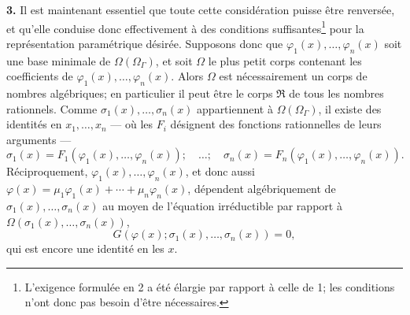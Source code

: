 \textbf{3.} Il est maintenant essentiel que toute cette considération puisse être renversée, et qu'elle conduise donc effectivement à des conditions suffisantes\footnote{L'exigence formulée en 2 a été élargie par rapport à celle de 1; les conditions n'ont donc pas besoin d'être nécessaires.} pour la représentation paramétrique désirée. Supposons donc que $\varphi_1(x),\ldots,\varphi_n(x)$ soit une base minimale de $\Omega(\Omega_\Gamma)$, et soit $\Omega$ le plus petit corps contenant les coefficients de $\varphi_1(x),\ldots,\varphi_n(x)$. Alors $\Omega$ est nécessairement un corps de nombres algébriques; en particulier il peut être le corps $\mathfrak R$ de tous les nombres rationnels. Comme $\sigma_1(x),\ldots,\sigma_n(x)$ appartiennent à $\Omega(\Omega_\Gamma)$, il existe des identités en $x_1,
\ldots,x_n$ --- où les $F_i$ désignent des fonctions rationnelles de leurs arguments ---
\begin{equation}\tag{5}
\sigma_1(x)=F_1(\varphi_1(x),\ldots,\varphi_n(x));\quad\ldots;\quad
\sigma_n(x)=F_n(\varphi_1(x),\ldots,\varphi_n(x)).
\end{equation}
Réciproquement, $\varphi_1(x),\ldots,\varphi_n(x)$, et donc aussi $\varphi(x)=\mu_1\varphi_1(x)+\cdots+\mu_n\varphi_n(x)$, dépendent algébriquement de $\sigma_1(x),\ldots,\sigma_n(x)$ au moyen de l'équation irréductible par rapport à $\Omega(\sigma_1(x),\ldots,\sigma_n(x))$,
\begin{equation}\tag{6}
G(\varphi(x);\sigma_1(x),\ldots,\sigma_n(x))=0,
\end{equation}
qui est encore une identité en les $x$.

